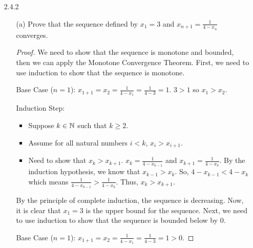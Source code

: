 \documentclass[12pt,letterpaper]{article}
\begin{document}
\begin{itemize}[leftmargin=!,labelindent=5pt]
\begin{proof}
\begin{align*}
                &= b_1 + b_2 + 2b_4 + 4b_8 + ... + 2^{k-1}b_{2^k}\\
                &= \frac{1}{2} (2b_1 + 2b_2 + 4b_4 + 8b_8 + ... + 2^kb_{2^k})\\
                &= \frac{1}{2} (b_1 + t_k).
            \end{align*}
            Since $(t_k)$ is unbounded and $s_m \geq \frac{t_k}{2}$, it must mean that $(s_m)$ is unbounded, and so $\sum_{n=1}^{\infty}b_n$ diverges.
        \end{proof}
    \item [2.4.2]
        \begin{itemize}
            \item [(a)] Prove that the sequence defined by $x_1 = 3$ and $x_{n+1} = \frac{1}{4-x_n}$ converges.
                \begin{proof}
                    We need to show that the sequence is monotone and bounded, then we can apply the Monotone Convergence Theorem.
                    First, we need to use induction to show that the sequence is monotone. 
                    
                    Base Case ($n=1$): $x_{1+1} = x_2 = \frac{1}{4-x_1} = \frac{1}{4-3} = 1$. $3 > 1$ so $x_1 > x_2$.

                    Induction Step:
                    \begin{itemize}
                        \item Suppose $k \in \mathbb{N}$ such that $k \geq 2$.
                        \item Assume for all natural numbers $i < k$, $x_i > x_{i+1}$.
                        \item Need to show that $x_{k} > x_{k+1}$.
                            $x_{k} = \frac{1}{4-x_{k-1}}$ and $x_{k+1} = \frac{1}{4-x_k}$.
                            By the induction hypothesis, we know that $x_{k-1} > x_{k}$.
                            So, $4 - x_{k-1} < 4 - x_k$ which means $\frac{1}{4-x_{k-1}} > \frac{1}{4-x_k}$.
                            Thus, $x_{k} > x_{k+1}$.
                    \end{itemize}
                    By the principle of complete induction, the sequence is decreasing.
                    Now, it is clear that $x_1 = 3$ is the upper bound for the sequence.
                    Next, we need to use induction to show that the sequence is bounded below by $0$.

                    Base Case ($n=1$): $x_{1+1} = x_2 = \frac{1}{4-x_1} = \frac{1}{4-3} = 1 > 0$.
                    

\end{proof}
\end{itemize}
\end{itemize}
\end{document}
